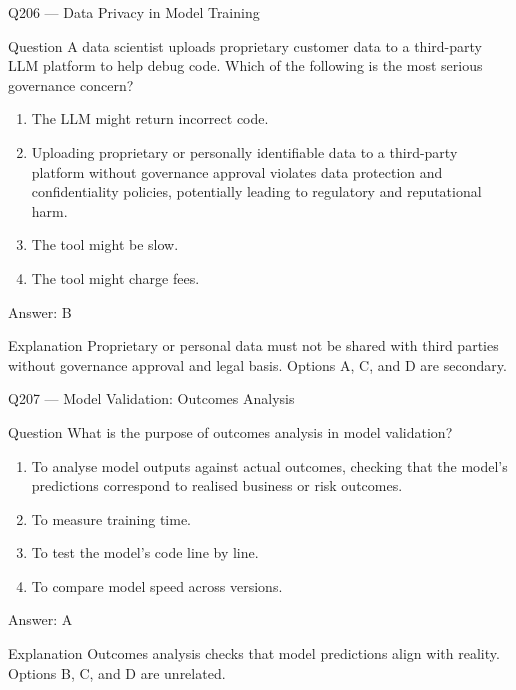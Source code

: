 \documentclass[aspectratio=169,8pt]{beamer}
\begin{document}
													\begin{frame}{Q206 --- Data Privacy in Model Training}
														\begin{block}{Question}
															A data scientist uploads proprietary customer data to a third-party LLM platform to help debug code. Which of the following is the most serious governance concern?
															\begin{enumerate}
																\item The LLM might return incorrect code.
																\item Uploading proprietary or personally identifiable data to a third-party platform without governance approval violates data protection and confidentiality policies, potentially leading to regulatory and reputational harm.
																\item The tool might be slow.
																\item The tool might charge fees.
															\end{enumerate}  \end{block}
															\begin{exampleblock}{Answer: B}\end{exampleblock}
															\begin{block}{Explanation}
																Proprietary or personal data must not be shared with third parties without governance approval and legal basis. Options A, C, and D are secondary.
															\end{block}
														\end{frame}
														
														\begin{frame}{Q207 --- Model Validation: Outcomes Analysis}
															\begin{block}{Question}
																What is the purpose of outcomes analysis in model validation?
																\begin{enumerate}
																	\item To analyse model outputs against actual outcomes, checking that the model's predictions correspond to realised business or risk outcomes.
																	\item To measure training time.
																	\item To test the model's code line by line.
																	\item To compare model speed across versions.
																\end{enumerate}  \end{block}
																\begin{exampleblock}{Answer: A}\end{exampleblock}
																\begin{block}{Explanation}
																	Outcomes analysis checks that model predictions align with reality. Options B, C, and D are unrelated.
																\end{block}
															\end{frame}
															
\end{document}
